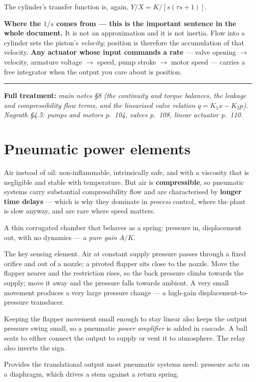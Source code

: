 \documentclass[11pt,a4paper]{article}
\newcommand{\fullmath}[1]{%
  \par\smallskip\noindent
  \textcolor{fnavy}{\rule{\textwidth}{0.4pt}}\par\vspace{-4pt}
  {\small\textcolor{fnavy}{\textbf{Full treatment:}} \textit{#1}}\par\smallskip}
\begin{document}
The cylinder's transfer function is, again, $Y/X = K/[s(\tau s+1)]$.

\begin{pitfall}
\textbf{Where the $1/s$ comes from --- this is the important sentence in the
whole document.} It is not an approximation and it is not inertia. Flow into a
cylinder sets the piston's \emph{velocity}; position is therefore the
accumulation of that velocity. \textbf{Any actuator whose input commands a
rate} --- valve opening $\to$ velocity, armature voltage $\to$ speed, pump
stroke $\to$ motor speed --- carries a free integrator when the output you care
about is position.
\end{pitfall}

\fullmath{main notes \S8 (the continuity and torque balances, the leakage and compressibility flow terms, and the linearised valve relation $q=K_{1}x-K_{2}p$). Nagrath \S4.5: pumps and motors p.~104, valves p.~108, linear actuator p.~110.}

\section{Pneumatic power elements}

Air instead of oil: non-inflammable, intrinsically safe, and with a viscosity
that is negligible and stable with temperature. But air is
\textbf{compressible}, so pneumatic systems carry substantial compressibility
flow and are characterised by \textbf{longer time delays} --- which is why they
dominate in \emph{process} control, where the plant is slow anyway, and are rare
where speed matters.

\begin{description}[leftmargin=*, style=nextline]
\item[Bellows] A thin corrugated chamber that behaves as a spring: pressure in,
  displacement out, with no dynamics --- a \emph{pure gain} $A/K$.
\item[Flapper--nozzle valve] The key sensing element. Air at constant supply
  pressure passes through a fixed orifice and out of a nozzle; a pivoted flapper
  sits close to the nozzle. Move the flapper nearer and the restriction rises,
  so the back pressure climbs towards the supply; move it away and the pressure
  falls towards ambient. A very small movement produces a very large pressure
  change --- a high-gain displacement-to-pressure transducer.
\item[Pneumatic relay] Keeping the flapper movement small enough to stay linear
  also keeps the output pressure swing small, so a pneumatic \emph{power
  amplifier} is added in cascade. A ball seats to either connect the output to
  supply or vent it to atmosphere. The relay also inverts the sign.
\item[Diaphragm actuator] Provides the translational output most pneumatic
  systems need: pressure acts on a diaphragm, which drives a stem against a
  return spring.
\end{description}
\end{document}
